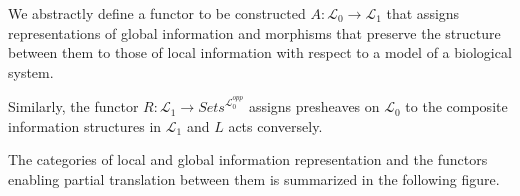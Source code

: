 \begin{frame}
\begin{block}{}
We abstractly define a functor to be constructed $A:\mathcal{L}_0 \rightarrow \mathcal{L}_1$ that assigns representations of global information and morphisms that preserve the structure between them to those of local information with respect to a model of a biological system.  
\end{block}
\begin{block}{}
Similarly, the functor $R: \mathcal{L}_1 \rightarrow \textit{Sets}^{\mathcal{L}_0^{opp}}$ assigns presheaves on $\mathcal{L}_0$ to the composite information structures in $\mathcal{L}_1$ and $L$ acts conversely. 
\end{block}
\begin{block}{}
The categories of local and global information representation and the functors enabling partial translation between them is summarized in the following figure.
\end{block}
\end{frame}